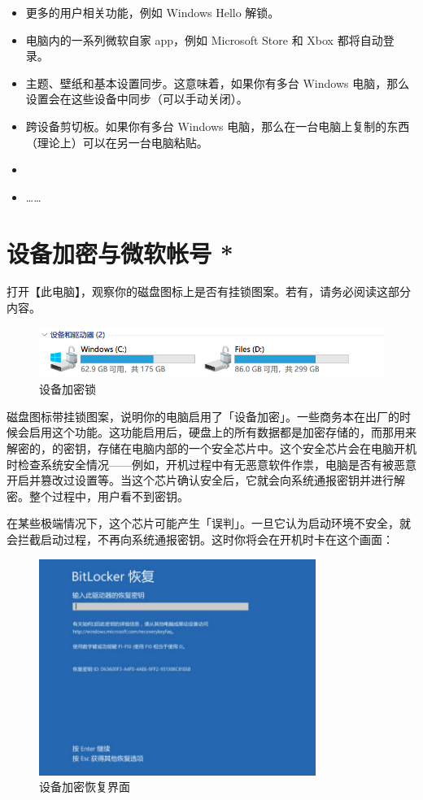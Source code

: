 \begin{itemize}
  \item 更多的用户相关功能，例如 Windows Hello 解锁。
  \item 电脑内的一系列微软自家 app，例如 Microsoft Store 和 Xbox 都将自动登录。
  \item 主题、壁纸和基本设置同步。这意味着，如果你有多台 Windows 电脑，那么设置会在这些设备中同步（可以手动关闭）。
  \item 跨设备剪切板。如果你有多台 Windows 电脑，那么在一台电脑上复制的东西（理论上）可以在另一台电脑粘贴。
  \item {}
  \item ……
\end{itemize}

\section{设备加密与微软帐号 *}

打开【此电脑】，观察你的磁盘图标上是否有挂锁图案。若有，请务必阅读这部分内容。

\begin{figure}[htb!]
  \centering
  \includegraphics[width=13cm]{assets/BitLocker.png}
  \caption{设备加密锁}
  \label{bitlocker}
\end{figure}

磁盘图标带挂锁图案，说明你的电脑启用了「设备加密」。一些商务本在出厂的时候会启用这个功能。这功能启用后，硬盘上的所有数据都是加密存储的，而那用来解密的，的密钥，存储在电脑内部的一个安全芯片中。这个安全芯片会在电脑开机时检查系统安全情况——例如，开机过程中有无恶意软件作祟，电脑是否有被恶意开启并篡改过设置等。当这个芯片确认安全后，它就会向系统通报密钥并进行解密。整个过程中，用户看不到密钥。

在某些极端情况下，这个芯片可能产生「误判」。一旦它认为启动环境不安全，就会拦截启动过程，不再向系统通报密钥。这时你将会在开机时卡在这个画面：

\begin{figure}[htb!]
  \centering
  \includegraphics[width=9cm]{assets/RecoverPass.jpg}
  \caption{设备加密恢复界面}
  \label{recover-pass}
\end{figure}

